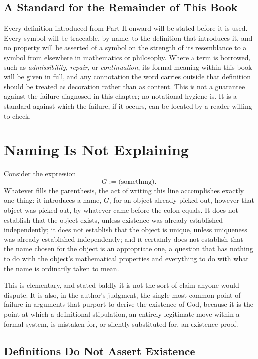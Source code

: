 \documentclass[11pt]{book}
\begin{document}
\section{A Standard for the Remainder of This Book}

Every definition introduced from Part II onward will be stated before it is used. Every symbol will be traceable, by name, to the definition that introduces it, and no property will be asserted of a symbol on the strength of its resemblance to a symbol from elsewhere in mathematics or philosophy. Where a term is borrowed, such as \emph{admissibility}, \emph{repair}, or \emph{continuation}, its formal meaning within this book will be given in full, and any connotation the word carries outside that definition should be treated as decoration rather than as content. This is not a guarantee against the failure diagnosed in this chapter; no notational hygiene is. It is a standard against which the failure, if it occurs, can be located by a reader willing to check.

\chapter{Naming Is Not Explaining}

Consider the expression
\[
G := \text{(something)}.
\]
Whatever fills the parenthesis, the act of writing this line accomplishes exactly one thing: it introduces a name, $G$, for an object already picked out, however that object was picked out, by whatever came before the colon-equals. It does not establish that the object exists, unless existence was already established independently; it does not establish that the object is unique, unless uniqueness was already established independently; and it certainly does not establish that the name chosen for the object is an appropriate one, a question that has nothing to do with the object's mathematical properties and everything to do with what the name is ordinarily taken to mean.

This is elementary, and stated baldly it is not the sort of claim anyone would dispute. It is also, in the author's judgment, the single most common point of failure in arguments that purport to derive the existence of God, because it is the point at which a definitional stipulation, an entirely legitimate move within a formal system, is mistaken for, or silently substituted for, an existence proof.

\section{Definitions Do Not Assert Existence}
\end{document}
